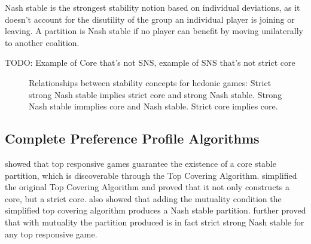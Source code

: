 \documentclass[letterpaper]{article} %
\begin{document}
Nash stable is the strongest stability notion based on individual deviations, as it doesn't account for the disutility of the group an individual player is joining or leaving. A partition is Nash stable if no player can benefit by moving unilaterally to another coalition.

TODO: Example of Core that's not SNS, example of SNS that's not strict core

\begin{figure}
\centering
{}
\caption{Relationships between stability concepts for hedonic games: Strict strong Nash stable implies strict core and strong Nash stable. Strong Nash stable immplies core and Nash stable. Strict core implies core.}
\end{figure}

\subsection{Complete Preference Profile Algorithms} \label{section:top_covering}

\cite{ALCALDE2004869} showed that top responsive games guarantee the existence of a core stable partition, which is discoverable through the Top Covering Algorithm. \cite{DIMITROV2007130} simplified the original Top Covering Algorithm and proved that it not only constructs a core, but a strict core. \cite{Dimitrov2006TopRA} also showed that adding the mutuality condition the simplified top covering algorithm produces a Nash stable partition. \cite{Aziz:2012:ESH:2343776.2343806} further proved that with mutuality the partition produced is in fact strict strong Nash stable for any top responsive game.
\end{document}
